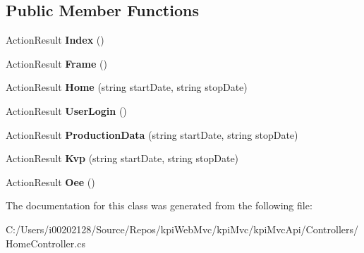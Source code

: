 \subsection*{Public Member Functions}
\begin{DoxyCompactItemize}
\item 
\mbox{\label{classkpi_mvc_api_1_1_controllers_1_1_home_controller_a10e3c3151fdc896f23d1ed374bdcd6cf}} 
Action\+Result {\bfseries Index} ()
\item 
\mbox{\label{classkpi_mvc_api_1_1_controllers_1_1_home_controller_a8fe51f06ec9db44e1766f89691af44f6}} 
Action\+Result {\bfseries Frame} ()
\item 
\mbox{\label{classkpi_mvc_api_1_1_controllers_1_1_home_controller_a136db913ab3394130e98d9e9376f2be9}} 
Action\+Result {\bfseries Home} (string start\+Date, string stop\+Date)
\item 
\mbox{\label{classkpi_mvc_api_1_1_controllers_1_1_home_controller_a52ba84d65a16f3ec9f7c18ef46313b23}} 
Action\+Result {\bfseries User\+Login} ()
\item 
\mbox{\label{classkpi_mvc_api_1_1_controllers_1_1_home_controller_ae5c2fcc4413eda2cab2775cd9819efca}} 
Action\+Result {\bfseries Production\+Data} (string start\+Date, string stop\+Date)
\item 
\mbox{\label{classkpi_mvc_api_1_1_controllers_1_1_home_controller_aab951608121b90d9424bb58c68bd0b23}} 
Action\+Result {\bfseries Kvp} (string start\+Date, string stop\+Date)
\item 
\mbox{\label{classkpi_mvc_api_1_1_controllers_1_1_home_controller_aa62132d07d9a778856a532fa6a2112b0}} 
Action\+Result {\bfseries Oee} ()
\end{DoxyCompactItemize}


The documentation for this class was generated from the following file\+:\begin{DoxyCompactItemize}
\item 
C\+:/\+Users/i00202128/\+Source/\+Repos/kpi\+Web\+Mvc/kpi\+Mvc/kpi\+Mvc\+Api/\+Controllers/Home\+Controller.\+cs\end{DoxyCompactItemize}
